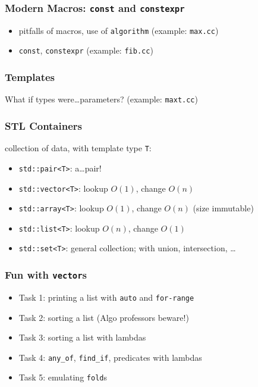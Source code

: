 \documentclass{beamer} \usetheme{Madrid}
\begin{document}
\begin{frame}
    \frametitle{Modern Macros: \texttt{const} and \texttt{constexpr}}
    \begin{itemize}
        \item pitfalls of macros, use of \texttt{algorithm}  (example: \texttt{max.cc})
        \item \texttt{const}, \texttt{constexpr} (example: \texttt{fib.cc})
    \end{itemize}
\end{frame}

\begin{frame}
    \frametitle{Templates}
    \vfill
    \begin{center}
        What if types were\ldots parameters? (example: \texttt{maxt.cc})
    \end{center}
    \vfill
\end{frame}
\begin{frame}
    \frametitle{STL Containers}
    collection of data, with template type \texttt{T}:
    \begin{itemize}
        \item \texttt{std::pair<T>}: a\ldots pair!
        \item \texttt{std::vector<T>}: lookup $O(1)$, change $O(n)$
        \item \texttt{std::array<T>}: lookup $O(1)$, change $O(n)$ (size immutable)
        \item \texttt{std::list<T>}: lookup $O(n)$, change $O(1)$
        \item \texttt{std::set<T>}: general collection; with union, intersection, \ldots
    \end{itemize}
\end{frame}

\begin{frame}
    \frametitle{Fun with \texttt{vector}s}
    \vfill
    \begin{itemize}
        \item Task 1: printing a list with \texttt{auto} and \texttt{for-range}
        \item Task 2: sorting a list (Algo professors beware!)
        \item Task 3: sorting a list with lambdas
        \item Task 4: \texttt{any\_of}, \texttt{find\_if}, predicates with lambdas
        \item Task 5: emulating \texttt{fold}s
    \end{itemize}
    \vfill
\end{frame}
\end{document}
